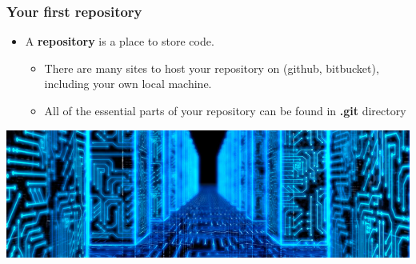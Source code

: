 \documentclass{beamer}
\begin{document}
\begin{frame}[fragile]
\frametitle{Your first repository}


\begin{itemize}
\item A \textbf{repository} is a place to store code.
\begin{itemize}
\item There are many sites to host your repository on (github, bitbucket), including your own local machine.
\item All of the essential parts of your repository can be found in \textbf{.git} directory
\end{itemize}

\end{itemize}

\includegraphics[width=\textwidth]{Storage.jpg}

\end{frame}
\end{document}
